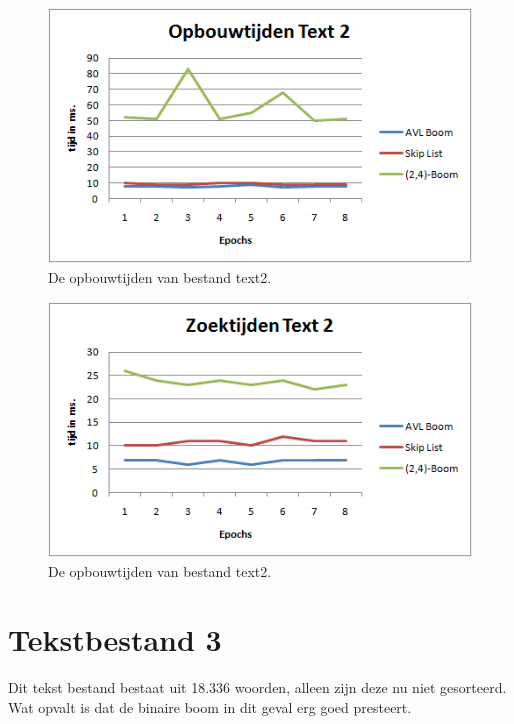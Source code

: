 \begin{figure}[h]
	\centering
		\includegraphics[width=\textwidth]{chap7/opbouwtijdtext2}
		\caption{De opbouwtijden van bestand text2.}
	\label{fig:opbouwtext2}
\end{figure}

\begin{figure}[h]
	\centering
		\includegraphics[width=\textwidth]{chap7/zoektijdtext2}
		\caption{De opbouwtijden van bestand text2.}
	\label{fig:zoektext2}
\end{figure}

\clearpage

\section{Tekstbestand 3}

Dit tekst bestand bestaat uit 18.336 woorden, alleen zijn deze nu niet gesorteerd. Wat opvalt is dat de binaire boom in dit geval erg goed presteert.

